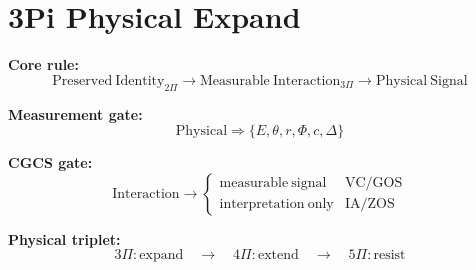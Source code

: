 \section*{3Pi Physical Expand}

\textbf{Core rule:}
\[
\mathrm{Preserved\ Identity}_{2\Pi}
\rightarrow
\mathrm{Measurable\ Interaction}_{3\Pi}
\rightarrow
\mathrm{Physical\ Signal}
\]

\textbf{Measurement gate:}
\[
\mathrm{Physical} \Rightarrow
\{E,\theta,r,\Phi,c,\Delta\}
\]

\textbf{CGCS gate:}
\[
\mathrm{Interaction} \rightarrow
\begin{cases}
\mathrm{measurable\ signal} & \text{VC/GOS} \\
\mathrm{interpretation\ only} & \text{IA/ZOS}
\end{cases}
\]

\textbf{Physical triplet:}
\[
3\Pi:\mathrm{expand}
\quad\rightarrow\quad
4\Pi:\mathrm{extend}
\quad\rightarrow\quad
5\Pi:\mathrm{resist}
\]
